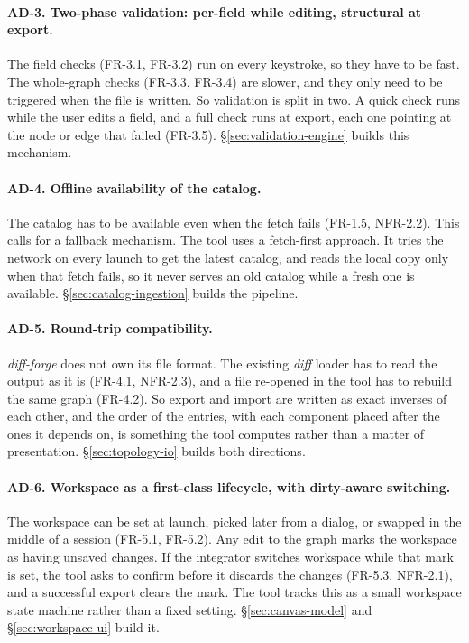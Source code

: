 \paragraph{AD-3. Two-phase validation: per-field while editing, structural at export.}
The field checks (FR-3.1, FR-3.2) run on every keystroke, so they have to be fast. The whole-graph checks (FR-3.3, FR-3.4) are slower, and they only need to be triggered when the file is written. So validation is split in two. A quick check runs while the user edits a field, and a full check runs at export, each one pointing at the node or edge that failed (FR-3.5). \S\ref{sec:validation-engine} builds this mechanism.

\paragraph{AD-4. Offline availability of the catalog.}
The catalog has to be available even when the fetch fails (FR-1.5, NFR-2.2). This calls for a fallback mechanism. The tool uses a fetch-first approach. It tries the network on every launch to get the latest catalog, and reads the local copy only when that fetch fails, so it never serves an old catalog while a fresh one is available. \S\ref{sec:catalog-ingestion} builds the pipeline.

\paragraph{AD-5. Round-trip compatibility.}
\textit{diff-forge} does not own its file format. The existing \textit{diff} loader has to read the output as it is (FR-4.1, NFR-2.3), and a file re-opened in the tool has to rebuild the same graph (FR-4.2). So export and import are written as exact inverses of each other, and the order of the entries, with each component placed after the ones it depends on, is something the tool computes rather than a matter of presentation. \S\ref{sec:topology-io} builds both directions.

\paragraph{AD-6. Workspace as a first-class lifecycle, with dirty-aware switching.}
The workspace can be set at launch, picked later from a dialog, or swapped in the middle of a session (FR-5.1, FR-5.2). Any edit to the graph marks the workspace as having unsaved changes. If the integrator switches workspace while that mark is set, the tool asks to confirm before it discards the changes (FR-5.3, NFR-2.1), and a successful export clears the mark. The tool tracks this as a small workspace state machine rather than a fixed setting. \S\ref{sec:canvas-model} and \S\ref{sec:workspace-ui} build it.